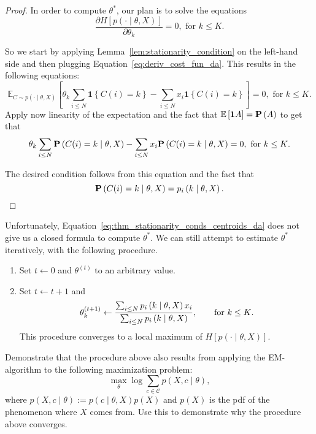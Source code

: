 \begin{proof}
In order to compute $\theta^*$, our plan is to solve the equations
%
\begin{equation}
\frac{\partial H \left[p(\cdot \mid \theta, X)\right]}{\partial \theta_k} = 0, \text{ for $k \leq K$}.
\end{equation}

So we start by applying Lemma~\ref{lem:stationarity_condition} on the left-hand side and then plugging Equation~\ref{eq:deriv_cost_fun_da}. This results in the following equations:
%
\begin{equation}
\mathbb{E}_{C \sim p(\cdot \mid \theta, X)}\left[\theta_k \sum_{i \leq N} \mathbf{1}\left\{C(i) = k\right\} - \sum_{i \leq N} x_i \mathbf{1}\left\{C(i) = k\right\}\right] = 0, \text{ for $k \leq K$}.
\end{equation}
%
Apply now linearity of the expectation and the fact that $\mathbb{E}\left[\mathbf{1}A\right] = \mathbf{P}\left(A\right)$ to get that
%
\begin{equation}
\theta_k \sum_{i \leq N} \mathbf{P}\left(C(i) = k \mid \theta, X\right) - \sum_{i \leq N}x_i \mathbf{P}\left(C(i) = k \mid \theta, X\right) = 0, \text{ for $k \leq K$}.
\end{equation}

The desired condition follows from this equation and the fact that 
%
\begin{equation}
\mathbf{P}\left(C(i) = k \mid \theta, X\right) = p_{i} \left(k\mid \theta, X\right).
\end{equation}
\end{proof}

Unfortunately, Equation~\ref{eq:thm_stationarity_conds_centroids_da} does not give us a closed formula to compute $\theta^*$. We can still attempt to estimate $\theta^*$ iteratively, with the following
procedure.

\begin{enumerate}
\item Set $t \gets 0$ and $\theta^{(t)}$ to an arbitrary value.
\item Set $t \gets t + 1$ and
%
\begin{equation}
\theta^{(t+1)}_k \gets \frac{\sum_{i \leq N} p_{i} \left(k\mid \theta, X\right)x_i}{\sum_{i \leq N}p_{i} \left(k\mid \theta, X\right)}, \qquad \text{for $k \leq K$}.
\end{equation}
%
This procedure converges to a local maximum of $H[p(\cdot \mid \theta, X)]$.
\end{enumerate}

\begin{exercise}
Demonstrate that the procedure above also results from applying
the EM-algorithm to the following maximization problem:
%
\begin{equation}
\max_{\theta} \log \sum_{c \in \mathcal{C}} p(X, c \mid \theta),
\end{equation}
%
where $p(X, c \mid \theta) := p(c \mid \theta, X)p(X)$ and $p(X)$ is the pdf of the phenomenon where $X$ comes from. Use this to demonstrate why the procedure above
converges.
\end{exercise}

